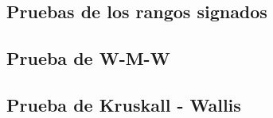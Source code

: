 \documentclass[
]{book}
\theoremstyle{definition}
\theoremstyle{definition}
\theoremstyle{definition}
\theoremstyle{definition}
\theoremstyle{remark}
\begin{document}
\hypertarget{pruebas-de-los-rangos-signados}{%
\subsection{Pruebas de los rangos signados}\label{pruebas-de-los-rangos-signados}}

\hypertarget{prueba-de-w-m-w}{%
\subsection{Prueba de W-M-W}\label{prueba-de-w-m-w}}

\hypertarget{prueba-de-kruskall---wallis}{%
\subsection{Prueba de Kruskall - Wallis}\label{prueba-de-kruskall---wallis}}

  
\end{document}
